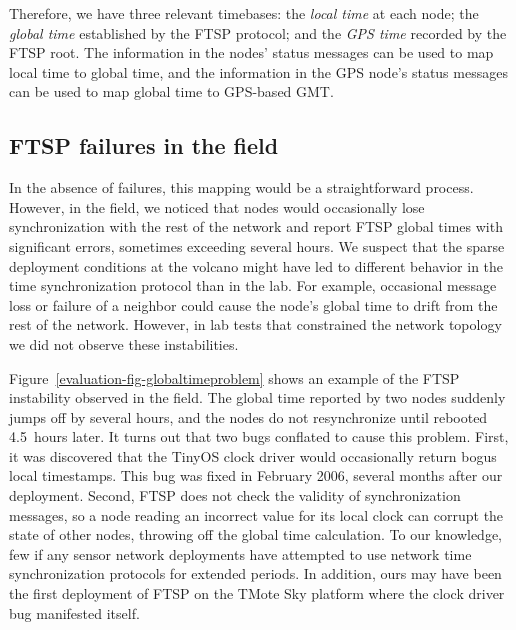 Therefore, we have three relevant timebases: the {\em local time} at each
node; the {\em global time} established by the FTSP protocol; and the {\em
GPS time} recorded by the FTSP root. The information in the nodes' status
messages can be used to map local time to global time, and the information in
the GPS node's status messages can be used to map global time to GPS-based
GMT.

\subsection{FTSP failures in the field}
\label{evaluation-timing-deploymentfailures}

In the absence of failures, this mapping would be a straightforward process.
However, in the field, we noticed that nodes would occasionally lose
synchronization with the rest of the network and report FTSP global times
with significant errors, sometimes exceeding several hours. We suspect that
the sparse deployment conditions at the volcano might have led to different
behavior in the time synchronization protocol than in the lab. For example,
occasional message loss or failure of a neighbor could cause the node's
global time to drift from the rest of the network.  However, in lab tests
that constrained the network topology we did not observe these instabilities.

Figure~\ref{evaluation-fig-globaltimeproblem} shows an example of the FTSP
instability observed in the field. The global time reported by two nodes
suddenly jumps off by several hours, and the nodes do not resynchronize until
rebooted 4.5~hours later.  It turns out that two bugs conflated to cause this
problem.  First, it was discovered that the TinyOS clock driver would
occasionally return bogus local timestamps.  This bug was fixed in February
2006, several months after our deployment.  Second, FTSP does not check the
validity of synchronization messages, so a node reading an incorrect value
for its local clock can corrupt the state of other nodes, throwing off the
global time calculation.  To our knowledge, few if any sensor network
deployments have attempted to use network time synchronization protocols for
extended periods.  In addition, ours may have been the first deployment of
FTSP on the TMote Sky platform where the clock driver bug manifested itself. 

